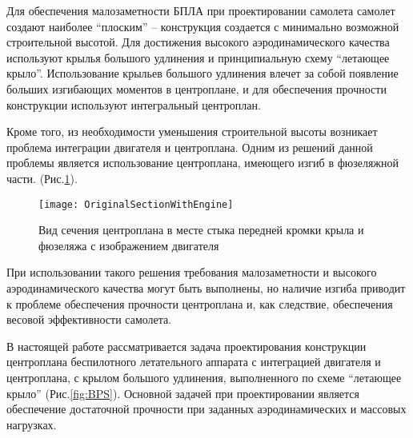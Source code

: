 


Для обеспечения малозаметности БПЛА при проектировании самолета самолет создают наиболее ``плоским'' -- конструкция создается с минимально возможной строительной высотой. Для достижения высокого аэродинамического качества используют крылья большого удлинения и принципиальную схему ``летающее крыло''. Использование крыльев большого удлинения влечет за собой появление больших изгибающих моментов в центроплане, и для обеспечения прочности конструкции используют интегральный центроплан. 


Кроме того, из необходимости уменьшения строительной высоты возникает проблема интеграции двигателя и центроплана. Одним из решений данной проблемы является использование центроплана, имеющего изгиб в фюзеляжной части. (Рис.\ref{fig:OriginalSectionWithEngine}). 



\begin{figure}[ht]
\captionsetup{justification=centering}
\centering
\texttt{[image: OriginalSectionWithEngine]}
\caption{Вид сечения центроплана в месте стыка передней кромки крыла и фюзеляжа с изображением двигателя}
\label{fig:OriginalSectionWithEngine}
\end{figure}


При использовании такого решения требования малозаметности и высокого аэродинамического качества могут быть выполнены, но наличие изгиба приводит к проблеме обеспечения прочности центроплана и, как следствие, обеспечения весовой эффективности самолета. 

В настоящей работе рассматривается задача проектирования конструкции центроплана беспилотного летательного аппарата с интеграцией двигателя и центроплана, с крылом большого удлинения, выполненного по схеме ``летающее крыло'' (Рис.\ref{fig:BPS}). Основной задачей при проектировании является обеспечение достаточной прочности при заданных аэродинамических и массовых нагрузках.


